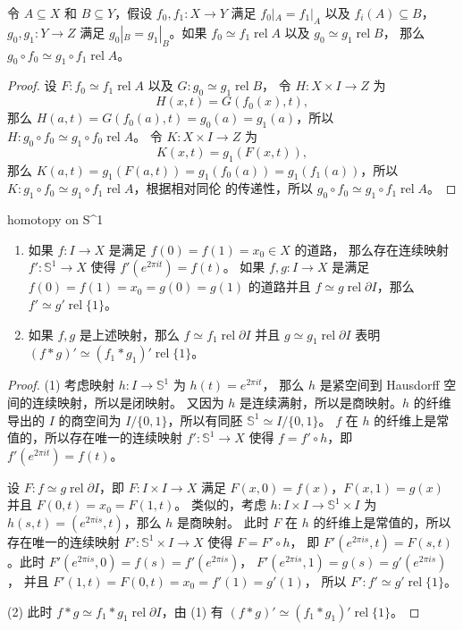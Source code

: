 \documentclass[fontset=none]{Notes}
\DeclareMathOperator\rel{rel}
\newcommand{\partI}{\partial I}
\newcommand{\relhomo}{\rel\partI}
\begin{document}
\begin{problem}{}{}
  令 $A\subseteq X$ 和 $B\subseteq Y$，假设 $f_0,f_1:X\to Y$
  满足 $f_0|_A=f_1|_A$ 以及 $f_i(A)\subseteq B$，$g_0,g_1:Y\to Z$
  满足 $g_0|_B=g_1|_B$。如果 $f_0\simeq f_1\rel A$ 以及 $g_0\simeq g_1\rel B$，
  那么 $g_0\circ f_0\simeq g_1\circ f_1\rel A$。
\end{problem}
\begin{proof}
  设 $F:f_0\simeq f_1\rel A$ 以及 $G:g_0\simeq g_1\rel B$，
  令 $H:X\times I\to Z$ 为
  \[
    H(x,t)=G(f_0(x),t),
  \]
  那么 $H(a,t)=G(f_0(a),t)=g_0(a)=g_1(a)$，所以 
  $H:g_0\circ f_0\simeq g_1\circ f_0\rel A$。
  令 $K:X\times I\to Z$ 为
  \[
    K(x,t)=g_1(F(x,t)),
  \]
  那么 $K(a,t)=g_1(F(a,t))=g_1(f_0(a))=g_1(f_1(a))$，所以
  $K:g_1\circ f_0\simeq g_1\circ f_1\rel A$，根据相对同伦
  的传递性，所以 $g_0\circ f_0\simeq g_1\circ f_1\rel A$。
\end{proof}

\begin{problem}{}{homotopy on S^1}
  \begin{enumerate}
    \item 如果 $f:I\to X$ 是满足 $f(0)=f(1)=x_0\in X$ 的道路，
    那么存在连续映射 $f':\mathbb{S}^1\to X$ 使得 $f'(e^{2\pi it})=f(t)$。
    如果 $f,g:I\to X$ 是满足 $f(0)=f(1)=x_0=g(0)=g(1)$ 的道路并且
    $f\simeq g\relhomo$，那么 $f'\simeq g'\rel\{1\}$。
    \item 如果 $f,g$ 是上述映射，那么 $f\simeq f_1\relhomo$
    并且 $g\simeq g_1\relhomo$ 表明 $(f*g)'\simeq (f_1*g_1)'\rel\{1\}$。
  \end{enumerate}
\end{problem}
\begin{proof}
  (1) 考虑映射 $h:I\to \mathbb{S}^1$ 为 $h(t)=e^{2\pi it}$，
  那么 $h$ 是紧空间到 Hausdorff 空间的连续映射，所以是闭映射。
  又因为 $h$ 是连续满射，所以是商映射。$h$ 的纤维导出的 $I$
  的商空间为 $I/\{0,1\}$，所以有同胚 $\mathbb{S}^1\simeq I/\{0,1\}$。
  $f$ 在 $h$ 的纤维上是常值的，所以存在唯一的连续映射 $f':\mathbb{S}^1\to X$
  使得 $f=f'\circ h$，即 $f'(e^{2\pi i t})=f(t)$。

  设 $F:f\simeq g\relhomo$，即 $F:I\times I\to X$ 满足
  $F(x,0)=f(x)$，$F(x,1)=g(x)$ 并且 $F(0,t)=x_0=F(1,t)$。
  类似的，考虑 $h:I\times I\to \mathbb{S}^1\times I$ 为
  $h(s,t)=(e^{2\pi i s},t)$，那么 $h$ 是商映射。
  此时 $F$ 在 $h$ 的纤维上是常值的，所以存在唯一的连续映射
  $F':\mathbb{S}^1\times I\to X$ 使得 $F=F'\circ h$，
  即 $F'(e^{2\pi i s},t)=F(s,t)$。此时
  $F'(e^{2\pi is},0)=f(s)=f'(e^{2\pi i s})$，
  $F'(e^{2\pi is},1)=g(s)=g'(e^{2\pi i s})$，
  并且 $F'(1,t)=F(0,t)=x_0=f'(1)=g'(1)$，
  所以 $F':f'\simeq g'\rel\{1\}$。

  (2) 此时 $f*g\simeq f_1*g_1\relhomo$，由 (1) 有
  $(f*g)'\simeq (f_1*g_1)'\rel\{1\}$。
\end{proof}
\end{document}
